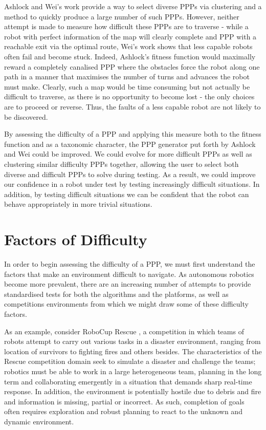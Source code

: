 \documentclass[authoryearcitations]{UoYCSproject}
\begin{document}
Ashlock and Wei's work provide a way to select diverse PPPs via clustering and a method to quickly produce a large number of such PPPs. However, neither attempt is made to measure how difficult these PPPs are to traverse - while a robot with perfect information of the map will clearly complete and PPP with a reachable exit via the optimal route, Wei's work shows that less capable robots often fail and become stuck. Indeed, Ashlock's fitness function would maximally reward a completely canalised PPP where the obstacles force the robot along one path in a manner that maximises the number of turns and advances the robot must make. Clearly, such a map would be time consuming but not actually be difficult to traverse, as there is no opportunity to become lost - the only choices are to proceed or reverse. Thus, the faults of a less capable robot are not likely to be discovered. 

By assessing the difficulty of a PPP and applying this measure both to the fitness function and as a taxonomic character, the PPP generator put forth by Ashlock and Wei could be improved. We could evolve for more difficult PPPs as well as clustering similar difficulty PPPs together, allowing the user to select both diverse and difficult PPPs to solve during testing. As a result, we could improve our confidence in a robot under test by testing increasingly difficult situations. In addition, by testing difficult situations we can be confident that the robot can behave appropriately in more trivial situations.


\section{Factors of Difficulty}
\label{sec:lit3}
In order to begin assessing the difficulty of a PPP, we must first understand the factors that make an environment difficult to navigate. As autonomous robotics become more prevalent, there are an increasing number of attempts to provide standardised tests for both the algorithms and the platforms, as well as competitions environments from which we might draw some of these difficulty factors. 

As an example, consider RoboCup Rescue \cite{robocup}, a competition in which teams of robots attempt to carry out various tasks in a disaster environment, ranging from location of survivors to fighting fires and others besides. The characteristics of the Rescue competition domain seek to simulate a disaster and challenge the teams; robotics must be able to work in a large heterogeneous team, planning in the long term and collaborating emergently in a situation that demands sharp real-time response. In addition, the environment is potentially hostile due to debris and fire and information is missing, partial or incorrect. As such, completion of goals often requires exploration and robust planning to react to the unknown and dynamic environment.
\end{document}
